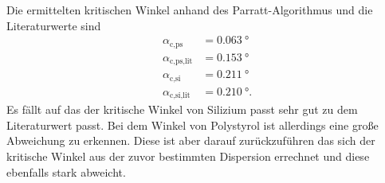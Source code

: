 Die ermittelten kritischen Winkel anhand des Parratt-Algorithmus und die Literaturwerte\cite{V44old} sind
\begin{align*}
    \alpha_\text{c,ps} &= \SI{0.063}{\degree} \\
    \alpha_\text{c,ps,lit} &= \SI{0.153}{\degree} \\
    \alpha_\text{c,si} &= \SI{0.211}{\degree} \\
    \alpha_\text{c,si,lit} &= \SI{0.210}{\degree}.
\end{align*}
Es fällt auf das der kritische Winkel von Silizium passt sehr gut zu dem Literaturwert passt.
Bei dem Winkel von Polystyrol ist allerdings eine große Abweichung zu erkennen.
Diese ist aber darauf zurückzuführen das sich der kritische Winkel aus der zuvor bestimmten Dispersion errechnet
und diese ebenfalls stark abweicht. 

